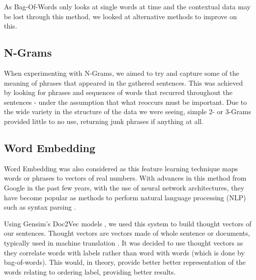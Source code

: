 \documentclass[bsc,frontabs,twoside,singlespacing,parskip,deptreport]{infthesis}     %
\begin{document}
As Bag-Of-Words only looks at single words at time and the contextual data may be lost through this method, we looked at
alternative methods to improve on this.

\subsection{N-Grams}
When experimenting with N-Grams, we aimed to try and capture some of the meaning of phrases that appeared in the gathered
sentences.
This was achieved by looking for phrases and sequences of words that recurred throughout the sentences - under the assumption
that what reoccurs must be important. Due to the wide variety in the structure of the data we were seeing,
simple 2- or 3-Grams provided little to no use, returning junk phrases if anything at all.





\subsection{Word Embedding} \label{sec:word-embedding}
Word Embedding was also considered as this feature learning technique maps words or phrases to vectors of real numbers.
With advances in this method from Google in the past few years, with the use of neural network architectures, they have become
popular as methods to perform natural language processing (NLP) such as syntax parsing \cite{socher2013parsing}.

Using Gensim's Doc2Vec models \cite{rehurek_lrec}, we used this system to build thought vectors of our sentences.
Thought vectors are vectors made of whole sentence or documents, typically used in machine translation \cite{deeplearning4j}.
It was decided to use thought vectors as they correlate words with labels rather than word with words (which is done by bag-of-words).
This would, in theory, provide better better representation of the words relating to ordering label, providing better results.
\end{document}
